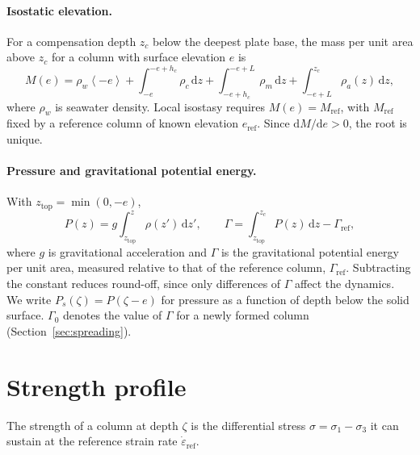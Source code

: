 \documentclass[11pt]{article}
\newcommand{\dd}{\,\mathrm{d}}
\newcommand{\mac}[1]{\left\langle #1 \right\rangle}
\begin{document}
\paragraph{Isostatic elevation.}
For a compensation depth $z_c$ below the deepest plate base, the mass per unit
area above $z_c$ for a column with surface elevation $e$ is
\begin{equation}
  M(e) = \rho_w \mac{-e}
  + \int_{-e}^{-e+h_c} \rho_c \dd z
  + \int_{-e+h_c}^{-e+L} \rho_m \dd z
  + \int_{-e+L}^{z_c} \rho_a(z) \dd z,
\end{equation}
where $\rho_w$ is seawater density. Local isostasy requires
$M(e) = M_{\mathrm{ref}}$, with $M_{\mathrm{ref}}$ fixed by a reference column
of known elevation $e_{\mathrm{ref}}$. Since $\mathrm{d}M/\mathrm{d}e > 0$, the
root is unique.

\paragraph{Pressure and gravitational potential energy.}
With $z_{\mathrm{top}} = \min(0,-e)$,
\begin{equation}
  P(z) = g \int_{z_{\mathrm{top}}}^{z} \rho(z')\dd z',
  \qquad
  \Gamma = \int_{z_{\mathrm{top}}}^{z_c} P(z)\dd z - \Gamma_{\mathrm{ref}},
  \label{eq:GPE}
\end{equation}
where $g$ is gravitational acceleration and $\Gamma$ is the gravitational
potential energy per unit area, measured relative to that of the reference
column, $\Gamma_{\mathrm{ref}}$. Subtracting the constant reduces round-off,
since only differences of $\Gamma$ affect the dynamics. We write
$P_s(\zeta) = P(\zeta - e)$ for pressure as a function of depth below the solid
surface. $\Gamma_0$ denotes the value of $\Gamma$ for a newly formed column
(Section~\ref{sec:spreading}).

\section{Strength profile}
\label{sec:strength}

The strength of a column at depth $\zeta$ is the differential stress
$\sigma = \sigma_1 - \sigma_3$ it can sustain at the reference strain rate
$\dot\varepsilon_{\mathrm{ref}}$.
\end{document}
